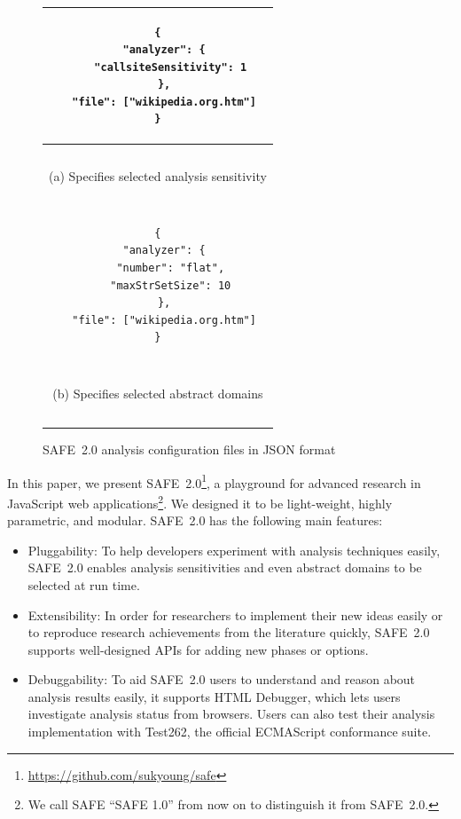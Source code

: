 \documentclass[10pt, conference]{IEEEtran}
\newcommand{\oldsafe}{{SAFE 1.0}\xspace}
\newcommand{\safe}{{SAFE~2.0}\xspace}
\newcommand{\htmldebug}{{\sf\small HTML Debugger}\xspace}
\begin{document}
\setcounter{figure}{0}
\begin{figure}[t]
\centering
\begin{tabular}{|c|}\hline
\begin{minipage}{.3\textwidth}
\footnotesize
\vspace*{.3em}
\begin{verbatim}
{
  "analyzer": {
    "callsiteSensitivity": 1
  },
  "file": ["wikipedia.org.htm"]
}
\end{verbatim}
\vspace*{.05em}
\end{minipage}
\\\hline
\multicolumn{1}{c}{~}\\[-.7em]
\multicolumn{1}{c}{\small (a) Specifies selected analysis sensitivity}\\
\multicolumn{1}{c}{~}\\[-.7em]
\hline
\begin{minipage}{.3\textwidth}
\footnotesize
\vspace*{.3em}
\begin{verbatim}
{
  "analyzer": {
    "number": "flat",
    "maxStrSetSize": 10
  },
  "file": ["wikipedia.org.htm"]
}
\end{verbatim}
\vspace*{.05em}
\end{minipage}\\\hline
\multicolumn{1}{c}{~}\\[-.7em]
\multicolumn{1}{c}{\small (b) Specifies selected abstract domains}\\
\multicolumn{1}{c}{~}\\[-.7em]
\end{tabular}
\caption{\small \safe analysis configuration files in JSON format}
\label{fig:pluggability}
\end{figure}


In this paper, we present \safe\footnote{
\url{https://github.com/sukyoung/safe}}, a playground
for advanced research in JavaScript web applications\footnote{
We call SAFE ``\oldsafe'' from now on to distinguish it from \safe.
}.  We designed it to be light-weight, highly parametric,
and modular.  \safe has the following main features:
\begin{itemize}
\item Pluggability: To help developers experiment with
analysis techniques easily, \safe enables analysis sensitivities
and even abstract domains to be selected at run time.

\item Extensibility: In order for researchers to implement their
new ideas easily or to reproduce research achievements from the
literature quickly, \safe supports well-designed APIs for adding new
phases or options.

\item Debuggability: To aid \safe users to understand and reason about
analysis results easily, it supports \htmldebug, which lets users
investigate analysis status from browsers.  Users can also
test their analysis implementation with Test262,
the official ECMAScript conformance suite.
\end{itemize}
\end{document}

